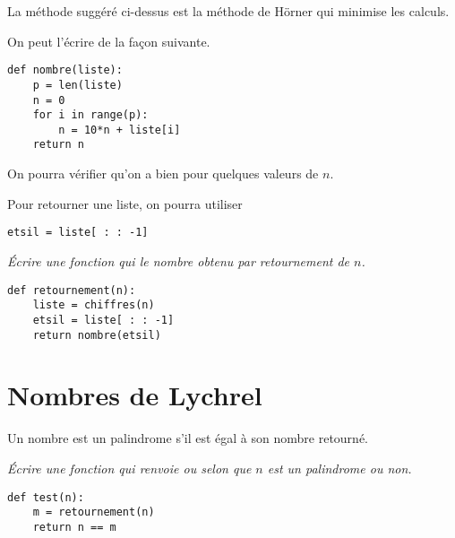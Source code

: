La méthode suggéré ci-dessus est la méthode de Hörner qui minimise les calculs.

On peut l'écrire de la façon suivante.
\begin{lstlisting}
def nombre(liste):
    p = len(liste)
    n = 0
    for i in range(p):
        n = 10*n + liste[i]
    return n
\end{lstlisting}
On pourra vérifier qu'on a bien  pour quelques valeurs de $n$.

\smallskip

Pour retourner une liste, on pourra utiliser
\begin{lstlisting}
etsil = liste[ : : -1]
\end{lstlisting}
\begin{Exercise}[title= Retournement d'un entier]\it
Écrire une fonction  qui le nombre obtenu par retournement de $n$.
\end{Exercise}
\begin{Answer} 
\begin{lstlisting}
def retournement(n):
    liste = chiffres(n)
    etsil = liste[ : : -1]
    return nombre(etsil)
\end{lstlisting}
\end{Answer}
\section{Nombres de Lychrel}
Un nombre est un palindrome s'il est égal à son nombre retourné.
\begin{Exercise}[title= Test de palindrome]\it 
Écrire une fonction  qui renvoie   ou  selon que $n$ est un palindrome ou non.
\end{Exercise}
\begin{Answer}
\begin{lstlisting}
def test(n):
    m = retournement(n)
    return n == m
\end{lstlisting}
\end{Answer}

